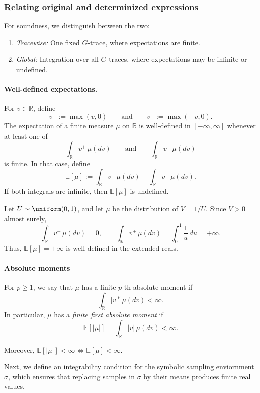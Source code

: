 \subsubsection{Relating original and determinized expressions}

For soundness, we distinguish between the two:
\begin{enumerate}
  \item \emph{Tracewise:} One fixed $G$-trace, where expectations are finite. 
  \item \emph{Global:} Integration over all $G$-traces, where expectations may be infinite or undefined. 
\end{enumerate}

\paragraph{Well-defined expectations.}
For $v\in\mathbb R$, define
\[
  v^+ := \max(v,0)
  \qquad\text{and}\qquad
  v^- := \max(-v,0).
\]
The expectation of a finite measure $\mu$ on $\mathbb R$ is
well-defined in $[-\infty,\infty]$ whenever at least one of
\[
  \int_{\mathbb R} v^+\,\mu(dv)
  \qquad\text{and}\qquad
  \int_{\mathbb R} v^-\,\mu(dv)
\]
is finite. In that case, define
\[
  \mathbb E[\mu]
  :=
  \int_{\mathbb R} v^+\,\mu(dv)
  -
  \int_{\mathbb R} v^-\,\mu(dv).
\]
If both integrals are infinite, then $\mathbb E[\mu]$ is undefined.

\begin{example}
  Let $U\sim\uniform(0,1)$, and let $\mu$ be the distribution of
  $V=1/U$. Since $V>0$ almost surely,
  \[
    \int_{\mathbb R}v^-\,\mu(dv)=0,
    \qquad
    \int_{\mathbb R}v^+\,\mu(dv)
    =
    \int_0^1\frac{1}{u}\,du
    =
    +\infty.
  \]
  Thus, $\mathbb E[\mu]=+\infty$ is well-defined in the extended reals.
\end{example}

\paragraph{Absolute moments}
For $p\geq1$, we say that $\mu$ has a finite $p$-th absolute moment if
\[
  \int_{\mathbb R}|v|^p\,\mu(dv)<\infty.
\]
In particular, $\mu$ has a \emph{finite first absolute moment} if
\[
  \mathbb E[|\mu|] = \int_{\mathbb R}|v|\,\mu(dv)<\infty.
\]

Moreover, $\mathbb E[|\mu|] < \infty \iff \mathbb E[\mu] < \infty$. 

Next, we define an integrability condition for the symbolic sampling enviornment $\sigma$, which ensures that replacing samples in $\sigma$ by their means produces finite real values.

